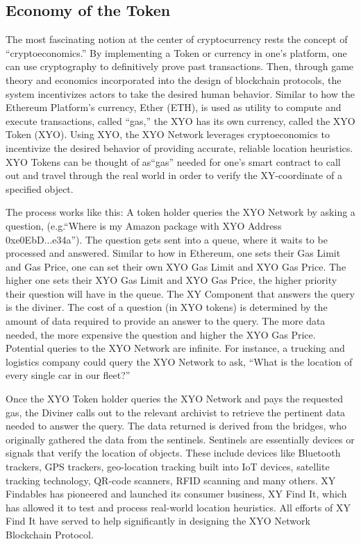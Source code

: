 \documentclass{article}
\begin{document}
\subsection {Economy of the Token}
The most fascinating notion at the center of cryptocurrency rests the concept of ``\gls{cryptoeconomics}.'' By implementing a Token or currency in one's platform, one can use cryptography to definitively prove past transactions. Then, through game theory and economics incorporated into the design of blockchain protocols, the system incentivizes actors to take the desired human behavior. Similar to how the Ethereum Platform's currency, Ether (ETH), is used as utility to compute and execute transactions, called ``\gls{gas},'' the \Gls{XYO} has its own currency, called the XYO Token (XYO). Using XYO, the XYO Network leverages cryptoeconomics to incentivize the desired behavior of providing accurate, reliable location \glspl{heuristic}. XYO Tokens can be thought of as``gas'' needed for one's smart contract to call out and travel through the real world in order to verify the XY-coordinate of a specified object.

The process works like this: A token holder queries the XYO Network by asking a question, (e.g.``Where is my Amazon package with XYO Address 0xe0EbD...e34a''). The question gets sent into a queue, where it waits to be processed and answered. Similar to how in Ethereum, one sets their Gas Limit and Gas Price, one can set their own XYO Gas Limit and XYO Gas Price. The higher one sets their XYO Gas Limit and XYO Gas Price, the higher priority their question will have in the queue. The XY Component that answers the query is the \Gls{diviner}. The cost of a question (in XYO tokens) is determined by the amount of data required to provide an answer to the query.  The more data needed, the more expensive the question and higher the XYO Gas Price. Potential queries to the XYO Network are infinite. For instance, a trucking and logistics company could query the XYO Network to ask, ``What is the location of every single car in our fleet?''

Once the XYO Token holder queries the XYO Network and pays the requested gas, the Diviner calls out to the relevant \Gls{archivist} to retrieve the pertinent data needed to answer the query. The data returned is derived from the \Glspl{bridge}, who originally gathered the data from the \Glspl{sentinel}. Sentinels are essentially devices or signals that verify the location of objects. These include devices like Bluetooth trackers, GPS trackers, geo-location tracking built into IoT devices, satellite tracking technology, QR-code scanners, RFID scanning and many others. XY Findables has pioneered and launched its consumer business, XY Find It, which has allowed it to test and process real-world location heuristics. All efforts of XY Find It have served to help significantly in designing the XYO Network Blockchain Protocol.
\end{document}
